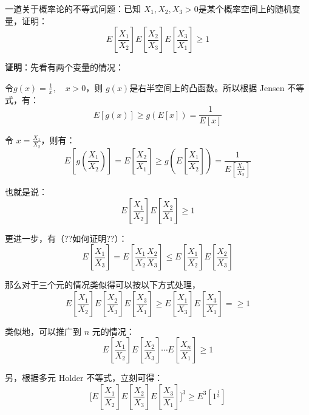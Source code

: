 \documentclass[12pt]{article}
\begin{document}
\begin{framed}  
一道关于概率论的不等式问题：已知 $X_1, X_2, X_3>0$是某个概率空间上的随机变量，证明：
$$
E[\frac{X_1}{X_2}]E[\frac{X_2}{X_3}]E[\frac{X_3}{X_1}] \ge 1
$$

\textbf{证明}：先看有两个变量的情况：

令$g(x) = \frac{1}{x}, \quad x > 0$，则 $g(x)$是右半空间上的凸函数。所以根据 Jensen 不等式，有：
$$
E[g(x)] \ge g(E[x]) = \frac{1}{E[x]}
$$

令 $x = \frac{X_1}{X_2}$，则有：
$$
E[g(\frac{X_1}{X_2})]  = E[\frac{X_2}{X_1}] \ge g(E[\frac{X_1}{X_2}]) = \frac{1}{E[\frac{X_1}{X_2}]}
$$

也就是说：
$$
E[\frac{X_1}{X_2}]E[\frac{X_2}{X_1}] \ge 1
$$

更进一步，有（??如何证明??）：
$$
E[\frac{X_1}{X_3}] = E[\frac{X_1}{X_2}\frac{X_2}{X_3}] \le E[\frac{X_1}{X_2}]E[\frac{X_2}{X_3}]
$$

那么对于三个元的情况类似得可以按以下方式处理，
$$
E[\frac{X_1}{X_2}]E[\frac{X_2}{X_3}]E[\frac{X_3}{X_1}] \ge E[\frac{X_1}{X_3}]E[\frac{X_3}{X_1}] = \ge 1
$$

类似地，可以推广到 $n$ 元的情况：
$$
E[\frac{X_1}{X_2}]E[\frac{X_2}{X_3}]\cdots E[\frac{X_n}{X_1}] \ge 1
$$

另，根据多元 Holder 不等式，立刻可得：
$$
\Big[ E[\frac{X_1}{X_2}] E[\frac{X_2}{X_3}] E[\frac{X_3}{X_1}] \Big]^3 \ge E^3[1^{\frac{1}{3}}]
$$
\end{framed}



\end{document}
